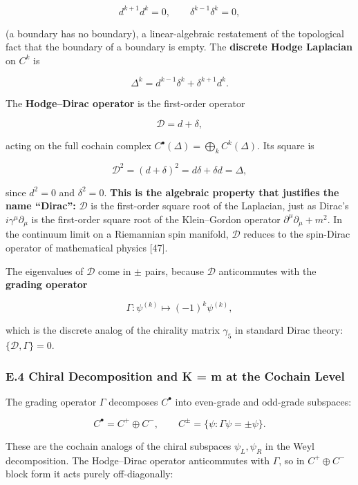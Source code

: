 \documentclass[
]{article}
\begin{document}
\[d^{k+1} d^k = 0, \qquad \delta^{k-1} \delta^k = 0,\]

(a boundary has no boundary), a linear-algebraic restatement of the
topological fact that the boundary of a boundary is empty. The
\textbf{discrete Hodge Laplacian} on \(C^k\) is

\[\boxed{\Delta^k = d^{k-1}\delta^k + \delta^{k+1}d^k.}\]

The \textbf{Hodge--Dirac operator} is the first-order operator

\[\boxed{\mathcal{D} = d + \delta,}\]

acting on the full cochain complex \(C^\bullet(\Delta) = \bigoplus_k
C^k(\Delta)\). Its square is

\[\mathcal{D}^2 = (d + \delta)^2 = d\delta + \delta d = \Delta,\]

since \(d^2 = 0\) and \(\delta^2 = 0\). \textbf{This is the algebraic
property that justifies the name ``Dirac'':} \(\mathcal{D}\) is the
first-order square root of the Laplacian, just as Dirac's
\(i\gamma^\mu \partial_\mu\) is the first-order square root of the
Klein--Gordon operator \(\partial^\mu \partial_\mu + m^2\). In the
continuum limit on a Riemannian spin manifold, \(\mathcal{D}\) reduces
to the spin-Dirac operator of mathematical physics {[}47{]}.

The eigenvalues of \(\mathcal{D}\) come in \(\pm\) pairs, because
\(\mathcal{D}\) anticommutes with the \textbf{grading operator}

\[\Gamma : \psi^{(k)} \mapsto (-1)^k \psi^{(k)},\]

which is the discrete analog of the chirality matrix \(\gamma_5\) in
standard Dirac theory: \(\{\mathcal{D}, \Gamma\} = 0\).

\subsubsection{E.4 Chiral Decomposition and K = m at the Cochain
Level}\label{e.4-chiral-decomposition-and-k-m-at-the-cochain-level}

The grading operator \(\Gamma\) decomposes \(C^\bullet\) into even-grade
and odd-grade subspaces:

\[C^\bullet = C^+ \oplus C^-, \qquad C^\pm = \{\psi : \Gamma\psi = \pm\psi\}.\]

These are the cochain analogs of the chiral subspaces \(\psi_L, \psi_R\)
in the Weyl decomposition. The Hodge--Dirac operator anticommutes with
\(\Gamma\), so in \(C^+ \oplus C^-\) block form it acts purely
off-diagonally:
\end{document}
